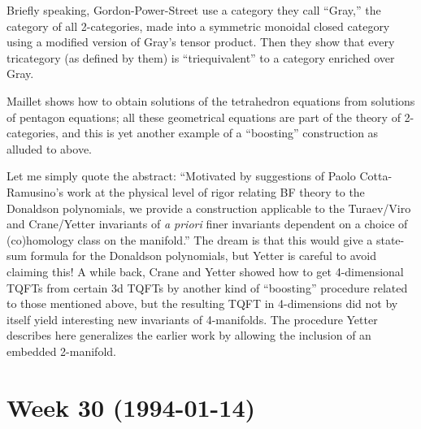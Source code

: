 \documentclass{article}
\def\tightlist{}
\renewcommand{\texttt}[1]{%
  \begingroup
  \ttfamily
  \begingroup\lccode`~=`/\lowercase{\endgroup\def~}{/\discretionary{}{}{}}%
  \begingroup\lccode`~=`[\lowercase{\endgroup\def~}{[\discretionary{}{}{}}%
  \begingroup\lccode`~=`.\lowercase{\endgroup\def~}{.\discretionary{}{}{}}%
  \catcode`/=\active\catcode`[=\active\catcode`.=\active
  \scantokens{#1\noexpand}%
  \endgroup
}
\begin{document}
Briefly speaking, Gordon-Power-Street use a category they call ``Gray,''
the category of all 2-categories, made into a symmetric monoidal closed
category using a modified version of Gray's tensor product. Then they
show that every tricategory (as defined by them) is ``triequivalent'' to
a category enriched over Gray.


Maillet shows how to obtain solutions of the tetrahedron equations from
solutions of pentagon equations; all these geometrical equations are
part of the theory of 2-categories, and this is yet another example of a
``boosting'' construction as alluded to above.


Let me simply quote the abstract: ``Motivated by suggestions of Paolo
Cotta-Ramusino's work at the physical level of rigor relating BF theory
to the Donaldson polynomials, we provide a construction applicable to
the Turaev/Viro and Crane/Yetter invariants of \emph{a priori} finer
invariants dependent on a choice of (co)homology class on the
manifold.'' The dream is that this would give a state-sum formula for
the Donaldson polynomials, but Yetter is careful to avoid claiming this!
A while back, Crane and Yetter showed how to get 4-dimensional TQFTs
from certain 3d TQFTs by another kind of ``boosting'' procedure related
to those mentioned above, but the resulting TQFT in 4-dimensions did not
by itself yield interesting new invariants of 4-manifolds. The procedure
Yetter describes here generalizes the earlier work by allowing the
inclusion of an embedded 2-manifold.
\hypertarget{week30}{%
\section{Week 30 (1994-01-14)}\label{week30}}
\end{document}
